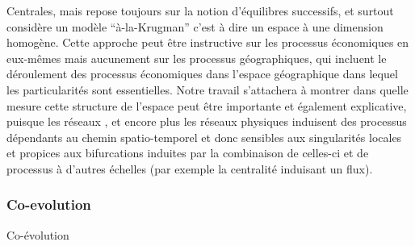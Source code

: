 {Centrales, mais repose toujours sur la notion d'équilibres successifs, et surtout considère un modèle ``à-la-Krugman'' c'est à dire un espace à une dimension homogène. Cette approche peut être instructive sur les processus économiques en eux-mêmes mais aucunement sur les processus géographiques, qui incluent le déroulement des processus économiques dans l'espace géographique dans lequel les particularités sont essentielles. Notre travail s'attachera à montrer dans quelle mesure cette structure de l'espace peut être importante et également explicative, puisque les réseaux , et encore plus les réseaux physiques induisent des processus dépendants au chemin spatio-temporel et donc sensibles aux singularités locales et propices aux bifurcations induites par la combinaison de celles-ci et de processus à d'autres échelles (par exemple la centralité induisant un flux).
}




\subsubsection{Co-evolution}{Co-évolution}


